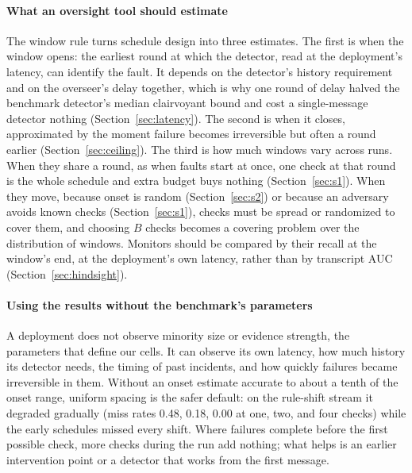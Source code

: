 \documentclass[pdflatex,sn-mathphys-num]{sn-jnl}
\theoremstyle{thmstyleone}%
\begin{document}
\paragraph{What an oversight tool should estimate}
The window rule turns schedule design into three estimates. The first is when the window opens: the earliest round at which the detector, read at the deployment's latency, can identify the fault. It depends on the detector's history requirement and on the overseer's delay together, which is why one round of delay halved the benchmark detector's median clairvoyant bound and cost a single-message detector nothing (Section~\ref{sec:latency}). The second is when it closes, approximated by the moment failure becomes irreversible but often a round earlier (Section~\ref{sec:ceiling}). The third is how much windows vary across runs. When they share a round, as when faults start at once, one check at that round is the whole schedule and extra budget buys nothing (Section~\ref{sec:s1}). When they move, because onset is random (Section~\ref{sec:s2}) or because an adversary avoids known checks (Section~\ref{sec:s1}), checks must be spread or randomized to cover them, and choosing $B$ checks becomes a covering problem over the distribution of windows. Monitors should be compared by their recall at the window's end, at the deployment's own latency, rather than by transcript AUC (Section~\ref{sec:hindsight}).

\paragraph{Using the results without the benchmark's parameters}
A deployment does not observe minority size or evidence strength, the parameters that define our cells. It can observe its own latency, how much history its detector needs, the timing of past incidents, and how quickly failures became irreversible in them. Without an onset estimate accurate to about a tenth of the onset range, uniform spacing is the safer default: on the rule-shift stream it degraded gradually (miss rates 0.48, 0.18, 0.00 at one, two, and four checks) while the early schedules missed every shift. Where failures complete before the first possible check, more checks during the run add nothing; what helps is an earlier intervention point or a detector that works from the first message.
\end{document}
